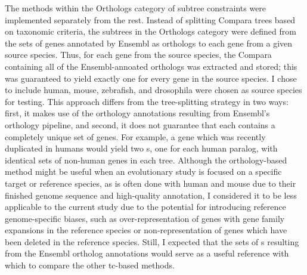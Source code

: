 The methods within the Orthologs category of subtree constraints were
implemented separately from the rest. Instead of splitting Compara
trees based on taxonomic criteria, the subtrees in the Orthologs
category were defined from the sets of genes annotated by Ensembl as
orthologs to each gene from a given source species. Thus, for each
gene from the source species, the Compara \subtr{} containing all of
the Ensembl-annoated orthologs was extracted and stored; this was
guaranteed to yield exactly one \subtr{} for every gene in the source
species. I chose to include human, mouse, zebrafish, and drosophila
were chosen as source species for testing. This approach differs from
the tree-splitting strategy in two ways: first, it makes use of the
orthology annotations resulting from Ensembl's orthology pipeline, and
second, it does not guarantee that each \subtr{} contains a completely
unique set of genes. For example, a gene which was recently duplicated
in humans would yield two \subtr{}s, one for each human paralog, with
identical sets of non-human genes in each tree. Although the
orthology-based method might be useful when an evolutionary study is
focused on a specific target or reference species, as is often done
with human and mouse due to their finished genome sequence and
high-quality annotation, I considered it to be less applicable to the
current study due to the potential for introducing reference
genome-specific biases, such as over-representation of genes with gene
family expansions in the reference species or non-representation of
genes which have been deleted in the reference species. Still, I
expected that the sets of \subtr{}s resulting from the Ensembl
ortholog annotations would serve as a useful reference with which to
compare the other \ac{tc}-based methods.

